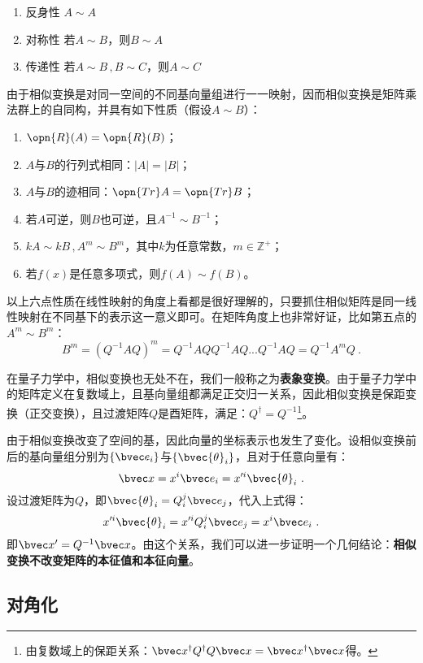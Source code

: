 \begin{enumerate}
\item 反身性 $A\sim A$ 
\item 对称性 若$A\sim B$，则$B\sim A$
\item 传递性 若$A\sim B\,,B\sim C$，则$A\sim C$
\end{enumerate}
由于相似变换是对同一空间的不同基向量组进行一一映射，因而相似变换是矩阵乘法群上的自同构，并具有如下性质（假设$A\sim B$）：
\begin{enumerate}
\item $\opn{R}(A)=\opn{R}(B)$；
\item $A$与$B$的行列式相同：$|A|=|B|$；
\item $A$与$B$的迹相同：$\opn{Tr}A=\opn{Tr}B$；
\item 若$A$可逆，则$B$也可逆，且$A^{-1}\sim B^{-1}$；
\item $kA\sim kB\,,A^m\sim B^m$，其中$k$为任意常数，$m\in \mathbb Z^{+}$；
\item 若$f(x)$是任意多项式，则$f(A)\sim f(B)$。
\end{enumerate}
以上六点性质在线性映射的角度上看都是很好理解的，只要抓住相似矩阵是同一线性映射在不同基下的表示这一意义即可。在矩阵角度上也非常好证，比如第五点的$A^m\sim B^m$：\begin{equation}
B^m=(Q^{-1}AQ)^m=Q^{-1}AQQ^{-1}AQ...Q^{-1}AQ=Q^{-1}A^mQ~.
\end{equation}

在量子力学中，相似变换也无处不在，我们一般称之为\textbf{表象变换}。由于量子力学中的矩阵定义在复数域上，且基向量组都满足正交归一关系，因此相似变换是保距变换（正交变换），且过渡矩阵$Q$是酉矩阵，满足：$Q^{\dagger}=Q^{-1}$\footnote{由复数域上的保距关系：$\bvec x^{\dagger}Q^{\dagger}Q\bvec x=\bvec x^{\dagger}\bvec x$得。}。

由于相似变换改变了空间的基，因此向量的坐标表示也发生了变化。设相似变换前后的基向量组分别为$\{\bvec e_i\}$与$\{\bvec {\theta}_i\}$，且对于任意向量有：
\begin{equation}
\bvec x=x^i\bvec e_i=x'^i\bvec {\theta}_i~.
\end{equation}
设过渡矩阵为$Q$，即$\bvec{\theta}_i=Q^j_i\bvec e_j$，代入上式得：
\begin{equation}
x'^i\bvec {\theta}_i=x'^iQ^j_i\bvec e_j=x^i\bvec e_i~.
\end{equation}
即$\bvec x'=Q^{-1}\bvec x$。由这个关系，我们可以进一步证明一个几何结论：\textbf{相似变换不改变矩阵的本征值和本征向量}。
\subsection{对角化}


